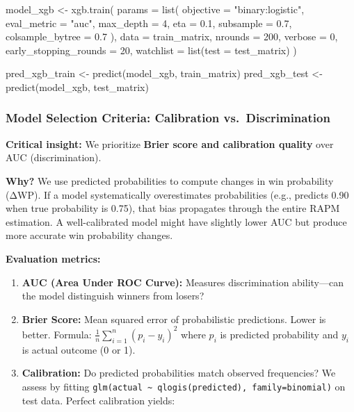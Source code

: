 \documentclass[
  letterpaper,
  DIV=11,
  numbers=noendperiod]{scrartcl}
\newenvironment{Shaded}{\begin{snugshade}}{\end{snugshade}}
\newcommand{\AttributeTok}[1]{\textcolor[rgb]{0.40,0.45,0.13}{#1}}
\newcommand{\DecValTok}[1]{\textcolor[rgb]{0.68,0.00,0.00}{#1}}
\newcommand{\FloatTok}[1]{\textcolor[rgb]{0.68,0.00,0.00}{#1}}
\newcommand{\FunctionTok}[1]{\textcolor[rgb]{0.28,0.35,0.67}{#1}}
\newcommand{\NormalTok}[1]{\textcolor[rgb]{0.00,0.23,0.31}{#1}}
\newcommand{\OtherTok}[1]{\textcolor[rgb]{0.00,0.23,0.31}{#1}}
\newcommand{\StringTok}[1]{\textcolor[rgb]{0.13,0.47,0.30}{#1}}
\providecommand{\tightlist}{%
  \setlength{\itemsep}{0pt}\setlength{\parskip}{0pt}}
\begin{document}
\begin{Shaded}
\begin{Highlighting}[]
\NormalTok{model\_xgb }\OtherTok{\textless{}{-}} \FunctionTok{xgb.train}\NormalTok{(}
  \AttributeTok{params =} \FunctionTok{list}\NormalTok{(}
    \AttributeTok{objective =} \StringTok{"binary:logistic"}\NormalTok{,}
    \AttributeTok{eval\_metric =} \StringTok{"auc"}\NormalTok{,}
    \AttributeTok{max\_depth =} \DecValTok{4}\NormalTok{,}
    \AttributeTok{eta =} \FloatTok{0.1}\NormalTok{,}
    \AttributeTok{subsample =} \FloatTok{0.7}\NormalTok{,}
    \AttributeTok{colsample\_bytree =} \FloatTok{0.7}
\NormalTok{  ),}
  \AttributeTok{data =}\NormalTok{ train\_matrix,}
  \AttributeTok{nrounds =} \DecValTok{200}\NormalTok{,}
  \AttributeTok{verbose =} \DecValTok{0}\NormalTok{,}
  \AttributeTok{early\_stopping\_rounds =} \DecValTok{20}\NormalTok{,}
  \AttributeTok{watchlist =} \FunctionTok{list}\NormalTok{(}\AttributeTok{test =}\NormalTok{ test\_matrix)}
\NormalTok{)}

\NormalTok{pred\_xgb\_train }\OtherTok{\textless{}{-}} \FunctionTok{predict}\NormalTok{(model\_xgb, train\_matrix)}
\NormalTok{pred\_xgb\_test }\OtherTok{\textless{}{-}} \FunctionTok{predict}\NormalTok{(model\_xgb, test\_matrix)}
\end{Highlighting}
\end{Shaded}

\subsubsection{Model Selection Criteria: Calibration
vs.~Discrimination}\label{model-selection-criteria-calibration-vs.-discrimination}

\textbf{Critical insight:} We prioritize \textbf{Brier score and
calibration quality} over AUC (discrimination).

\textbf{Why?} We use predicted probabilities to compute changes in win
probability (ΔWP). If a model systematically overestimates probabilities
(e.g., predicts 0.90 when true probability is 0.75), that bias
propagates through the entire RAPM estimation. A well-calibrated model
might have slightly lower AUC but produce more accurate win probability
changes.

\textbf{Evaluation metrics:}

\begin{enumerate}
\def\labelenumi{\arabic{enumi}.}
\tightlist
\item
  \textbf{AUC (Area Under ROC Curve):} Measures discrimination
  ability---can the model distinguish winners from losers?
\item
  \textbf{Brier Score:} Mean squared error of probabilistic predictions.
  Lower is better. Formula: \(\frac{1}{n}\sum_{i=1}^{n}(p_i - y_i)^2\)
  where \(p_i\) is predicted probability and \(y_i\) is actual outcome
  (0 or 1).
\item
  \textbf{Calibration:} Do predicted probabilities match observed
  frequencies? We assess by fitting
  \texttt{glm(actual\ \textasciitilde{}\ qlogis(predicted),\ family=binomial)}
  on test data. Perfect calibration yields:
\end{enumerate}
\end{document}
